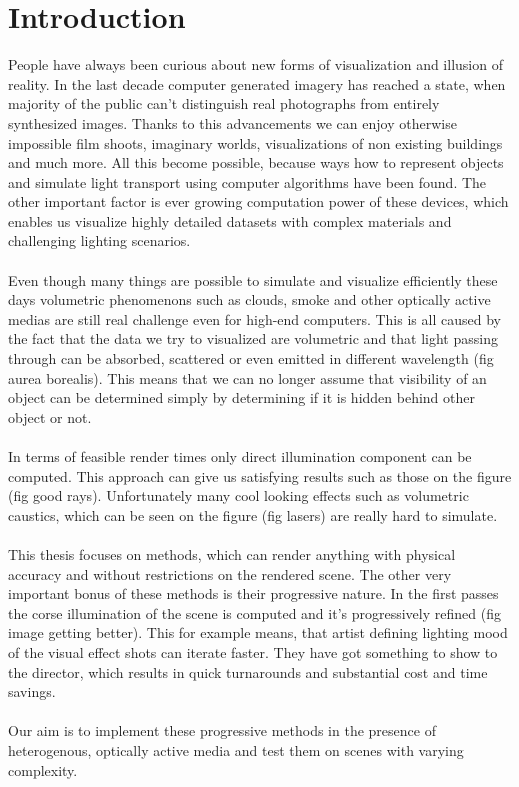 \chapter{Introduction}
People have always been curious about new forms of visualization and illusion of reality. In the last decade computer generated imagery has reached a state, when majority of the public can't distinguish real photographs from entirely synthesized images. Thanks to this advancements we can enjoy otherwise impossible film shoots, imaginary worlds, visualizations of non existing buildings and much more. All this become possible, because ways how to represent objects and simulate light transport using computer algorithms have been found. The other important factor is ever growing computation power of these devices, which enables us visualize highly detailed datasets with complex materials and challenging lighting scenarios.
\\
\\
Even though many things are possible to simulate and visualize efficiently these days volumetric phenomenons such as clouds, smoke and other optically active medias are still real challenge even for high-end computers. This is all caused by the fact that the data we try to visualized are volumetric and that light passing through can be absorbed, scattered or even emitted in different wavelength (fig aurea borealis). This means that we can no longer assume that visibility of an object can be determined simply by determining if it is hidden behind other object or not.
\\
\\
In terms of feasible render times only direct illumination component can be computed. This approach can give us satisfying results such as those on the figure (fig good rays).  Unfortunately many cool looking effects such as volumetric caustics, which can be seen on the figure (fig lasers) are really hard to simulate.
\\
\\
This thesis focuses on methods, which can render anything with physical accuracy and without restrictions on the rendered scene. The other very important bonus of these methods is their progressive nature. In the first passes the corse illumination of the scene is computed and it's progressively refined (fig image getting better). This for example means, that artist defining lighting mood of the visual effect shots can iterate faster. They have got something to show to the director, which results in quick turnarounds and substantial cost and time savings.
\\
\\
Our aim is to implement these progressive methods in the presence of heterogenous, optically active media and test them on scenes with varying complexity.
\\
\\

